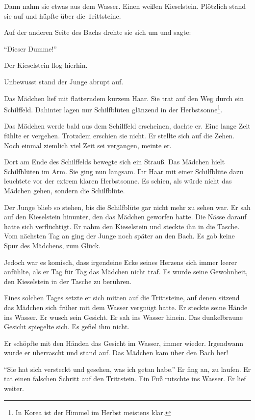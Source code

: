 \documentclass[prd,12pt,tightenlines,notitlepage,nofootinbib]{revtex4-1}
\begin{document}
Dann nahm sie etwas aus dem Wasser.
Einen weißen Kieselstein.  Plötzlich stand sie auf und hüpfte über die
Trittsteine.

Auf der anderen Seite des Bachs drehte sie sich um und
sagte:

"`Dieser Dumme!"'

Der Kieselstein flog hierhin.

Unbewusst stand der Junge abrupt auf.

Das Mädchen lief mit flatterndem kurzem
Haar.  Sie trat auf den Weg durch ein Schilffeld.  Dahinter lagen nur
Schilfblüten glänzend in der Herbstsonne\footnote{In Korea ist
der Himmel im Herbst meistens klar.}.

Das Mädchen werde bald aus dem
Schilffeld erscheinen, dachte er.  Eine lange Zeit fühlte er vergehen.
Trotzdem erschien sie nicht.  Er stellte sich auf die Zehen.  Noch einmal
ziemlich viel Zeit sei vergangen, meinte er.

Dort am Ende des
Schilffelds bewegte sich ein Strauß.  Das Mädchen hielt Schilfblüten
im Arm.  Sie ging nun langsam.  Ihr Haar mit einer Schilfblüte dazu
leuchtete vor der extrem klaren Herbstsonne.  Es schien, als würde
nicht das Mädchen gehen, sondern die Schilfblüte.

Der Junge blieb
so stehen, bis die Schilfblüte gar nicht mehr zu sehen war.  Er sah
auf den Kieselstein hinunter, den das Mädchen geworfen hatte.  Die Nässe darauf
hatte sich verflüchtigt.  Er nahm den Kieselstein und steckte ihn in die
Tasche.
\\

Vom nächsten Tag an ging der Junge noch später an den Bach.  Es gab
keine Spur %
des Mädchens, zum Glück.

Jedoch war es komisch, dass
irgendeine Ecke seines Herzens sich immer leerer anfühlte, als er Tag für
Tag das Mädchen nicht traf.  Es wurde seine Gewohnheit, den
Kieselstein in der Tasche zu berühren.

Eines solchen Tages setzte er
sich mitten auf die Trittsteine, auf denen sitzend das Mädchen sich früher mit
dem Wasser vergnügt hatte.  Er steckte seine Hände ins Wasser.
Er wusch sein Gesicht.  Er sah ins Wasser hinein.  Das dunkelbraune
Gesicht spiegelte sich.  Es gefiel ihm nicht.

Er schöpfte mit den
Händen das Gesicht im Wasser, immer wieder.  Irgendwann wurde er
überrascht und stand auf.  Das Mädchen kam über den Bach her!

"`Sie hat sich versteckt und gesehen, was ich getan habe."'
Er fing an,
zu laufen.  Er tat einen falschen Schritt auf den Trittstein.  Ein
Fuß rutschte ins Wasser.  Er lief weiter.
\end{document}
